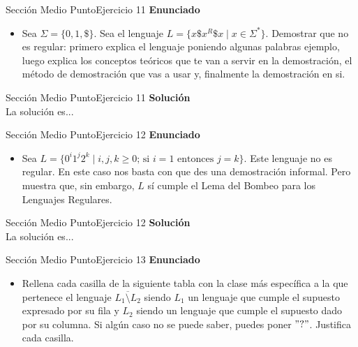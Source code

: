 \documentclass[10pt, envcountsect, presentation, aspectratio=169]{beamer}
\begin{document}

\begin{frame}{Sección Medio Punto}{Ejercicio 11}
    \textbf{Enunciado}
    \begin{itemize}
        \item Sea $\Sigma=\{0,1,\$\}$. Sea el lenguaje $L=\{x\$x^R\$x \mid x \in \Sigma^*\}$. Demostrar que no es regular: primero explica el lenguaje poniendo algunas palabras ejemplo, luego explica los conceptos teóricos que te van a servir en la demostración, el método de demostración que vas a usar y, finalmente la demostración en si.
    \end{itemize}
\end{frame}


\begin{frame}{Sección Medio Punto}{Ejercicio 11}
    \textbf{Solución}\\
    La solución es...
\end{frame}


\begin{frame}{Sección Medio Punto}{Ejercicio 12}
    \textbf{Enunciado}
    \begin{itemize}
        \item Sea $L= \{ 0^i 1^j 2^k \mid i,j,k \geq0 \mbox{; si } i=1 \mbox{ entonces } j=k \} $. Este lenguaje no es regular. En este caso nos basta con que des una  demostración informal. Pero muestra que, sin embargo,  $L$ sí cumple el Lema del Bombeo para los Lenguajes Regulares.
    \end{itemize}
\end{frame}


\begin{frame}{Sección Medio Punto}{Ejercicio 12}
    \textbf{Solución}\\
    La solución es...
\end{frame}


\begin{frame}{Sección Medio Punto}{Ejercicio 13}
    \textbf{Enunciado}
    \begin{itemize}
        \item Rellena cada casilla de la siguiente tabla con la clase más específica a la que pertenece el lenguaje  $\overline{L_1 \setminus L_2}$ siendo $L_1$ un lenguaje que cumple el supuesto expresado por su fila y $L_2$ siendo un lenguaje que cumple el supuesto dado por su columna. Si algún caso no se puede saber, puedes poner   $"?"$. Justifica cada casilla.\\
    \end{itemize}
\end{frame}
\end{document}
